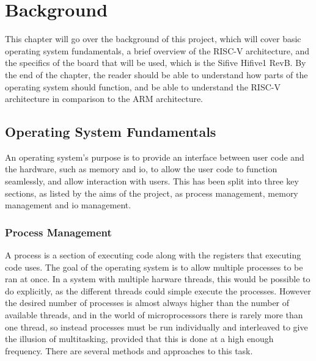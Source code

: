 \chapter[Background]{Background}
\label{cha:backgr}
This chapter will go over the background of this project, which will cover basic operating system fundamentals, a brief overview of the RISC-V architecture, and the specifics of the board that will be used, which is the Sifive Hifive1 RevB. By the end of the chapter, the reader should be able to understand how parts of the operating system should function, and be able to understand the RISC-V architecture in comparison to the ARM architecture.
\section{Operating System Fundamentals}
An operating system's purpose is to provide an interface between user code and the hardware, such as memory and \ac{io}, to allow the user code to function seamlessly, and allow interaction with users. This has been split into three key sections, as listed by the aims of the project, as process management, memory management and \ac{io} management.\cite{modern_operating}
\subsection{Process Management}
A process is a section of executing code along with the registers that executing code uses. The goal of the operating system is to allow multiple processes to be ran at once. In a system with multiple harware threads, this would be possible to do explicitly, as the different threads could simple execute the processes. However the desired number of processes is almost always higher than the number of available threads, and in the world of microprocessors there is rarely more than one thread, so instead processes must be run individually and interleaved to give the illusion of multitasking, provided that this is done at a high enough frequency. There are several methods and approaches to this task. \cite{modern_operating}
